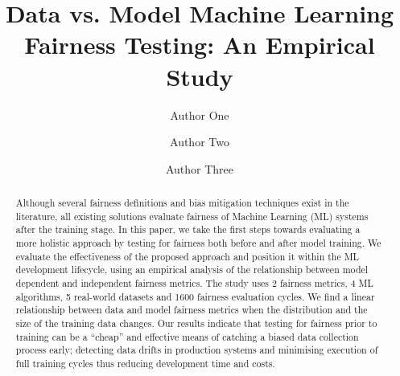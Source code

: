 \documentclass[sigconf,review]{acmart}
\begin{document}
\title{Data vs. Model Machine Learning Fairness Testing: An Empirical Study}

\author{Author One}

\author{Author Two}

\author{Author Three}




\begin{abstract}

Although several fairness definitions and bias mitigation techniques
  exist in the literature, all existing solutions evaluate fairness of
  Machine Learning (ML) systems after the training stage. In this
  paper, we take the first steps towards evaluating a more holistic
  approach by testing for fairness both before and after model
  training. We evaluate the effectiveness of the proposed approach and
  position it within the ML development lifecycle, using an empirical
  analysis of the relationship between model dependent and independent
  fairness metrics. The study uses 2 fairness metrics, 4 ML
  algorithms, 5 real-world datasets and 1600 fairness evaluation
  cycles. We find a linear relationship between data and model
  fairness metrics when the distribution and the size of the training
  data changes. Our results indicate that testing for fairness prior
  to training can be a ``cheap'' and effective means of catching
  a biased data collection process early; detecting data drifts in
  production systems and minimising execution of full training cycles
  thus reducing development time and costs.

\end{abstract}

\maketitle
\end{document}
